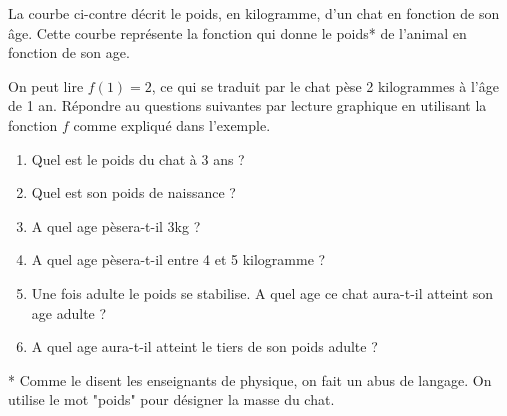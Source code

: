 
\begin{minipage}{0.48\linewidth}
La courbe ci-contre décrit le poids, en kilogramme, d’un chat en fonction de son âge. Cette courbe représente la fonction
qui donne le poids* de l’animal en fonction de son age.

On peut lire $f (1) = 2$, ce qui se traduit par le chat pèse 2 kilogrammes à l'âge de 1 an.
Répondre au questions suivantes par lecture graphique en utilisant la fonction $f$ comme expliqué dans l'exemple.

\begin{enumerate}
\item Quel est le poids du chat à 3 ans ?
\item Quel est son poids de naissance ?
\item A quel age pèsera-t-il 3kg ?
\item A quel age pèsera-t-il entre 4 et 5 kilogramme ?
\item Une fois adulte le poids se stabilise. A quel age ce chat aura-t-il atteint son age adulte ?
\item  A quel age aura-t-il atteint le tiers de son poids adulte ?
\end{enumerate}
* Comme le disent les enseignants de physique, on fait un abus de langage. On utilise le mot "poids" pour désigner la masse du chat.
\end{minipage}
\hfill
